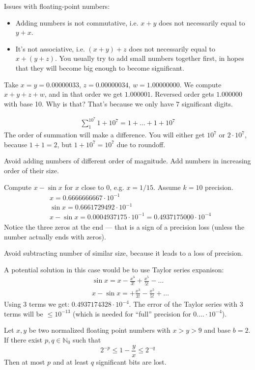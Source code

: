 Issues with floating-point numbers:
\begin{itemize}
    \item {
        Adding numbers is not commutative, i.e.
        $x + y$ does not necessarily equal to $y + x$.
    }
    \item {
        It's not associative, i.e.
        $(x + y) + z$ does not necessarily equal to $x + (y + z)$.
        You usually try to add small numbers together first, in hopes that they 
        will become big enough to become significant.
    }
\end{itemize}
\begin{example}[1]
    Take $x = y = 0.00000033$, $z = 0.00000034$, $w = 1.00000000$.
    We compute $x + y + z + w$, and in that order we get $1.000001$.
    Reversed order gets $1.000000$ with base 10. Why is that?
    That's because we only have $7$ significant digits.
\end{example}
\begin{example}[2]
    \begin{align*}
        \sum_{1}^{10^7} 1 + 10^7 = 1 + \dots + 1 + 10^7
    \end{align*}
    The order of summation will make a difference. You will either get 
    $10^7$ or $2 \cdot 10^7$, because $1 + 1 = 2$, but $1 + 10^7 = 10^7$
    due to roundoff.
\end{example}
\begin{consequence}
    Avoid adding numbers of different order of magnitude.
    Add numbers in increasing order of their size.
\end{consequence}
\begin{example}[3]
    Compute $x - \sin{x}$ for $x$ close to $0$, e.g. $x = 1 / 15$.
    Assume $k = 10$ precision.
    \begin{align*}
        &
        x = 0.6666666667 \cdot 10^{-1}
        \\&
        \sin{x} = 0.6661729492 \cdot 10^{-1}
        \\&
        x - \sin{x} = 0.0004937175 \cdot 10^{-1} = 
        0.4937175\underline{000} \cdot 10^{-4}
    \end{align*}
    Notice the three zeros at the end --- that is a sign of 
    a precision loss (unless the number actually ends with zeros).
    \begin{consequence}
        Avoid subtracting number of similar size, because it leads to
        a loss of precision.
    \end{consequence}
    A potential solution in this case would be to use Taylor series expanison:
    \begin{align*}
        &
        \sin{x} = x - \frac{x^3}{3!} + \frac{x^5}{5!} - \dots
        \\&
        x - \sin{x} = +\frac{x^3}{3!} - \frac{x^5}{5!} + \dots
    \end{align*}
    Using 3 terms we get: $0.4937174328 \cdot 10^{-4}$.
    The error of the Taylor series with 3 terms will be 
    $\le 10^{-13}$ (which is needed for ``full'' precision for $0.\dots \cdot 10^{-4}$).
\end{example}
\begin{theorem}
    Let $x, y$ be two normalized floating point numbers
    with $x > y > 9$ and base $b=2$. If there exist $p, q \in \mathbb{N}_0$ such that
    \[ 2^{-p} \le 1 - \frac{y}{x} \le 2^{-q} \]
    Then at most $p$ and at least $q$ significant bits are lost.
\end{theorem}
